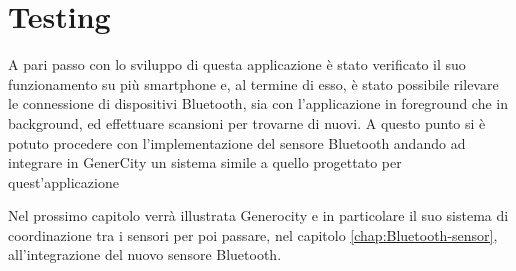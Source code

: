 \section{Testing}
A pari passo con lo sviluppo di questa applicazione è stato verificato il suo funzionamento su più smartphone e, al termine di esso, è stato possibile rilevare le connessione di dispositivi Bluetooth, sia con l'applicazione in foreground che in background, ed effettuare scansioni per trovarne di nuovi. A questo punto si è potuto procedere con l'implementazione del sensore Bluetooth andando ad integrare in GenerCity un sistema simile a quello progettato per quest'applicazione

Nel prossimo capitolo verrà illustrata Generocity e in particolare il suo sistema di coordinazione tra i sensori per poi passare, nel capitolo \ref{chap:Bluetooth-sensor}, all'integrazione del nuovo sensore Bluetooth.